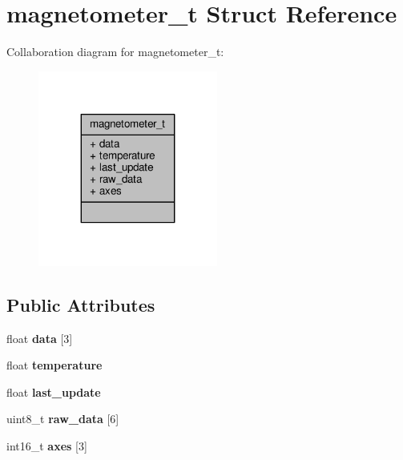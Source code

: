 \hypertarget{structmagnetometer__t}{\section{magnetometer\+\_\+t Struct Reference}
\label{structmagnetometer__t}
}


Collaboration diagram for magnetometer\+\_\+t\+:
\nopagebreak
\begin{figure}[H]
\begin{center}
\leavevmode
\includegraphics[width=167pt]{structmagnetometer__t__coll__graph}
\end{center}
\end{figure}
\subsection*{Public Attributes}
\begin{DoxyCompactItemize}
\item 
\hypertarget{structmagnetometer__t_a24352e17927972698fa4a1316f31a668}{float {\bfseries data} \mbox{[}3\mbox{]}}\label{structmagnetometer__t_a24352e17927972698fa4a1316f31a668}

\item 
\hypertarget{structmagnetometer__t_a360f2c3c507e82ade9b026e793cc7455}{float {\bfseries temperature}}\label{structmagnetometer__t_a360f2c3c507e82ade9b026e793cc7455}

\item 
\hypertarget{structmagnetometer__t_ab0684629f4b702ca9e6f59aa4e38720e}{float {\bfseries last\+\_\+update}}\label{structmagnetometer__t_ab0684629f4b702ca9e6f59aa4e38720e}

\item 
\hypertarget{structmagnetometer__t_a5d6f5e7bb6896c1389ef0ad2d5fed383}{uint8\+\_\+t {\bfseries raw\+\_\+data} \mbox{[}6\mbox{]}}\label{structmagnetometer__t_a5d6f5e7bb6896c1389ef0ad2d5fed383}

\item 
\hypertarget{structmagnetometer__t_a9f1c1e1ba6a12eb973c6ac8fcf728491}{int16\+\_\+t {\bfseries axes} \mbox{[}3\mbox{]}}\label{structmagnetometer__t_a9f1c1e1ba6a12eb973c6ac8fcf728491}

\end{DoxyCompactItemize}


